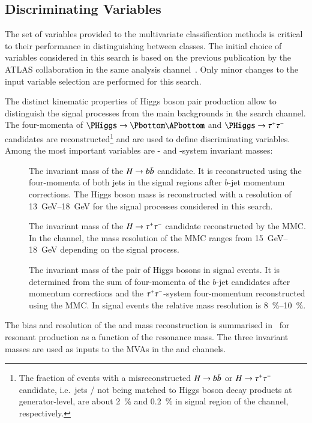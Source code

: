\subsection{Discriminating Variables}%
\label{sec:mva_discriminating variables}

The set of variables provided to the multivariate classification
methods is critical to their performance in distinguishing between
classes. The initial choice of variables considered in this search is
based on the previous publication by the ATLAS collaboration in the
same analysis channel~\cite{HIGG-2016-16-witherratum}. Only minor
changes to the input variable selection are performed for this search.

The distinct kinematic properties of Higgs boson pair production allow
to distinguish the signal processes from the main backgrounds in the
\bbtautau search channel. The four-momenta of
$\PHiggs \ra \Pbottom\APbottom$ and $\PHiggs \ra \tautau$ candidates
are reconstructed\footnote{The fraction of events with a
  misreconstructed $H \to b\bar{b}$ or $H \to \tau^{+} \tau^{-}$ candidate, i.e.\
  \btagged jets / \tauhadvis not being matched to Higgs boson decay
  products at generator-level, are about \SI{2}{\percent} and
  \SI{0.2}{\percent} in signal region of the \hadhad channel,
  respectively.}  and are used to define discriminating variables.
Among the most important variables are \PHiggs- and \HH-system
invariant masses:
\begin{description}

\item[\mBB] The invariant mass of the $H \to b\bar{b}$ candidate. It is
  reconstructed using the four-momenta of both \btagged jets in the
  signal regions after $b$-jet momentum corrections. The Higgs boson
  mass is reconstructed with a resolution of \SIrange{13}{18}{\GeV}
  for the signal processes considered in this search.

\item[\mMMC] The invariant mass of the $H \to \tau^{+} \tau^{-}$ candidate
  reconstructed by the MMC. In the \hadhad channel, the mass
  resolution of the MMC ranges from \SIrange{15}{18}{\GeV} depending
  on the signal process.

\item[\mHH] The invariant mass of the pair of Higgs bosons in signal
  events. It is determined from the sum of four-momenta of the $b$-jet
  candidates after momentum corrections and the $\tau^{+} \tau^{-}$-system
  four-momentum reconstructed using the MMC. In signal events the
  relative mass resolution is \SIrange{8}{10}{\percent}.

\end{description}
The bias and resolution of the \PHiggs and \HH mass reconstruction is
summarised in~\Cref{fig:mass_reconstruction} for resonant \HH
production as a function of the resonance mass. The three invariant
masses are used as inputs to the MVAs in the \hadhad and \lephad
channels.

